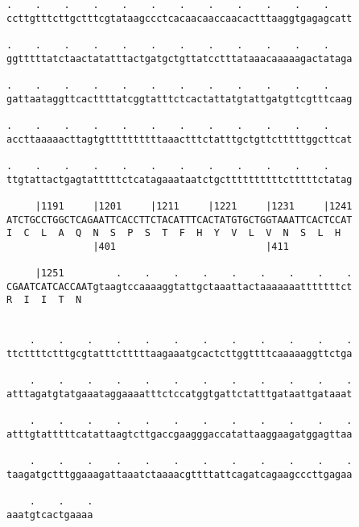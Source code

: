 \documentclass{article}
\begin{document}
\begin{Verbatim}
.    .    .    .    .    .    .    .    .    .    .    .    
ccttgtttcttgctttcgtataagccctcacaacaaccaacactttaaggtgagagcatt
                                                            
.    .    .    .    .    .    .    .    .    .    .    .    
ggtttttatctaactatatttactgatgctgttatcctttataaacaaaaagactataga
                                                            
.    .    .    .    .    .    .    .    .    .    .    .    
gattaataggttcacttttatcggtatttctcactattatgtattgatgttcgtttcaag
                                                            
.    .    .    .    .    .    .    .    .    .    .    .    
accttaaaaacttagtgttttttttttaaactttctatttgctgttctttttggcttcat
                                                            
.    .    .    .    .    .    .    .    .    .    .    .    
ttgtattactgagtatttttctcatagaaataatctgcttttttttttctttttctatag
                                                            
     |1191     |1201     |1211     |1221     |1231     |1241
ATCTGCCTGGCTCAGAATTCACCTTCTACATTTCACTATGTGCTGGTAAATTCACTCCAT
I  C  L  A  Q  N  S  P  S  T  F  H  Y  V  L  V  N  S  L  H  
               |401                          |411           
  
     |1251         .    .    .    .    .    .    .    .    .
CGAATCATCACCAATgtaagtccaaaaggtattgctaaattactaaaaaaatttttttct
R  I  I  T  N                                               
                                                            
  
    .    .    .    .    .    .    .    .    .    .    .    .
ttcttttctttgcgtatttctttttaagaaatgcactcttggttttcaaaaaggttctga
                                                            
    .    .    .    .    .    .    .    .    .    .    .    .
atttagatgtatgaaataggaaaatttctccatggtgattctatttgataattgataaat
                                                            
    .    .    .    .    .    .    .    .    .    .    .    .
atttgtatttttcatattaagtcttgaccgaagggaccatattaaggaagatggagttaa
                                                            
    .    .    .    .    .    .    .    .    .    .    .    .
taagatgctttggaaagattaaatctaaaacgttttattcagatcagaagcccttgagaa
                                                            
    .    .    .
aaatgtcactgaaaa
               

\end{Verbatim}
\end{document}
